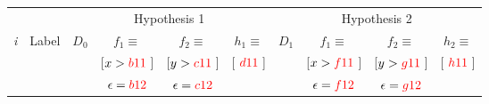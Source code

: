 \documentclass{article}
\begin{document}
\begin{center}
        \begin{tabular}{|c|c||c|c|c|c||c|c|c|c|}
        \hline
          & & \multicolumn{4}{c||}{Hypothesis 1}
	  & \multicolumn{4}{c|}{Hypothesis 2} \\
          \cline{3-10}
          {\em i} & Label & $D_0$ & $f_1 \equiv $ & $f_2 \equiv $ & $h_1\equiv$ & $D_1$ &  $f_1 \equiv $ & $f_2 \equiv $ & $h_2 \equiv $ \\
          & & & [$x > {\color{red} b11} \;$] & [$y > {\color{red} c11}\;$] & [$\; {\color{red} d11} \;$] & & [$x > {\color{red} f11}\;$] & [$y > {\color{red} g11}\;$] & [$\;{\color{red} h11}\;$] \\
          
          & & & $\epsilon = {\color{red} b12}$ & $\epsilon = {\color{red} c12}$ & & & $\epsilon = {\color{red} f12}$ & $\epsilon = {\color{red} g12}$ & \\


\end{tabular}
\end{center}
\end{document}
